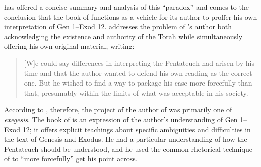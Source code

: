 \vanderkam has offered a concise summary and analysis of this ``\psgraphical paradox'' and comes to the conclusion that the book of \jub functions as a vehicle for its author to proffer his own interpretation of Gen 1--Exod 12. \vanderkam addresses the problem of \jub's author both acknowledging the existence and authority of the Torah while simultaneously offering his own original material, writing:

\begin{quote}
    [W]e could say differences in interpreting the Pentateuch had arisen by his time and that the author wanted to defend his own reading as the correct one. But he wished to find a way to package his case more forcefully than that, presumably within the limits of what was acceptable in his society.\autocite[28]{vanderkam_metso-etal2010}
\end{quote}

\noindent
According to \vanderkam, therefore, the project of the author of \jub was primarily one of \emph{exegesis}. The book of \jub is an expression of the author's understanding of Gen 1--Exod 12; it offers explicit teachings about specific ambiguities and difficulties in the text of Genesis and Exodus. He had a particular understanding of how the Pentateuch should be understood, and he used the common rhetorical technique of \psy to ``more forcefully'' get his point across.

